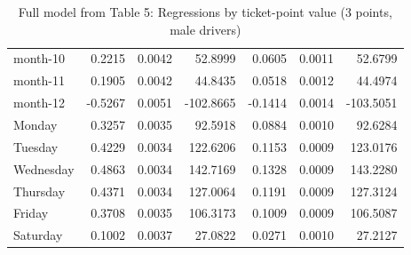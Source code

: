 \documentclass[10pt]{article}
\begin{document}
\begin{table}[ht]
\begin{tabular}{lrrrrrr}
  month-10 & 0.2215 & 0.0042 & 52.8999 & 0.0605 & 0.0011 & 52.6799 \\ 
  month-11 & 0.1905 & 0.0042 & 44.8435 & 0.0518 & 0.0012 & 44.4974 \\ 
  month-12 & -0.5267 & 0.0051 & -102.8665 & -0.1414 & 0.0014 & -103.5051 \\ 
  Monday & 0.3257 & 0.0035 & 92.5918 & 0.0884 & 0.0010 & 92.6284 \\ 
  Tuesday & 0.4229 & 0.0034 & 122.6206 & 0.1153 & 0.0009 & 123.0176 \\ 
  Wednesday & 0.4863 & 0.0034 & 142.7169 & 0.1328 & 0.0009 & 143.2280 \\ 
  Thursday & 0.4371 & 0.0034 & 127.0064 & 0.1191 & 0.0009 & 127.3124 \\ 
  Friday & 0.3708 & 0.0035 & 106.3173 & 0.1009 & 0.0009 & 106.5087 \\ 
  Saturday & 0.1002 & 0.0037 & 27.0822 & 0.0271 & 0.0010 & 27.2127 \\ 
   \hline
\end{tabular}
\caption{Full model from Table 5: Regressions by ticket-point value (3 points, male drivers)} 
\label{tab_5_3_pts_no_age_M}
\end{table}


\clearpage
\pagebreak



\end{document}
